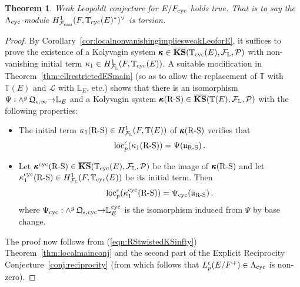 \documentclass[12pt]{amsart}
\numberwithin{equation}{section}
\newtheorem{thm}{Theorem}[section]
\begin{document}
\begin{thm}
\label{thm:theweakleopoldtconjforE}
Weak Leopoldt conjecture for $E/F_{\textup{cyc}}$ holds true. That is to say the ${\Lambda}_{\textup{cyc}}$-module
$H^1_{\mathcal{F}_{\textup{\lowercase{can}}}}(F,{\mathbb{T}}_{\textup{cyc}}(E)^{*})^\vee$ is torsion.
\end{thm}
\begin{proof}
By Corollary~\ref{cor:localnonvanishingimpliesweakLeoforE}, it suffices to prove the existence of a Kolyvagin system $\pmb{\kappa}\in\overline{\mathbf{KS}}({\mathbb{T}}_{\textup{cyc}}(E),{\mathcal{F}}_{\mathbb{L}},{\mathcal{P}})$ with non-vanishing initial term $\kappa_1 \in H^1_{{\mathcal{F}}_{\mathbb{L}}}(F,{\mathbb{T}}_{\textup{cyc}}(E))$. A suitable modification in Theorem~\ref{thm:ellrestrictedESmain} (so as to allow the replacement of ${\mathbb{T}}$ with ${\mathbb{T}}(E)$ and ${\mathcal{L}}$ with $\mathbb{L}_E$, etc.) shows that  there is an isomorphism $\Psi:\wedge^g\,\frak{Q}_{\epsilon,\infty} {\rightarrow} \mathbb{L}_{E}$  and a Kolyvagin system $\pmb{\kappa}(\textup{R-S})\in \overline{\mathbf{KS}}({\mathbb{T}}(E),{\mathcal{F}}_{\mathbb{L}},{\mathcal{P}})$  with the following properties: 
\begin{itemize}
\item The initial term $\kappa_1(\textup{R-S})\in H^1_{{\mathcal{F}}_{\mathbb{L}}}(F,{\mathbb{T}}(E))$ of $\pmb{\kappa}(\textup{R-S})$ verifies that 
\begin{equation}\label{eqn:RStwistedKSinfty}
\textup{loc}_p^\epsilon(\kappa_1(\textup{R-S}))=\Psi ({\frak{u}}_{\textup{R-S}})\,.
\end{equation}
\item Let $\pmb{\kappa}^{\textup{cyc}}(\textup{R-S})\in \overline{\mathbf{KS}}({\mathbb{T}}_{\textup{cyc}}(E),{\mathcal{F}}_{\mathbb{L}},{\mathcal{P}})$ be the image of $\pmb{\kappa}(\textup{R-S})$ and let $\kappa_1^{\textup{cyc}}(\textup{R-S}) \in H^1_{{\mathcal{F}}_{\mathbb{L}}}(F,{\mathbb{T}}_{\textup{cyc}}(E))$ be its initial term. Then
\begin{equation}\label{eqn:RStwistedKSinfty} 
\textup{loc}_p^\epsilon(\kappa_1^{\textup{cyc}}(\textup{R-S}))=\Psi_{\textup{cyc}}({\bar{\frak{u}}}_{\textup{R-S}})\,.
\end{equation}
where $\Psi_{\textup{cyc}}:\wedge^g\,\frak{Q}_{\epsilon,{\textup{cyc}}} {\rightarrow} \mathbb{L}_{E}^{\textup{cyc}}$ is the isomorphism induced from $\Psi$ by base change.
\end{itemize}
The proof now follows from (\ref{eqn:RStwistedKSinfty}) Theorem~\ref{thm:localmainconj} and the second part of the Explicit Reciprocity Conjecture~\ref{conj:reciprocity} (from which follows that $L_p^\epsilon(E/F^+)\in {\Lambda}_{\textup{cyc}}$ is non-zero).
\end{proof}
\end{document}
